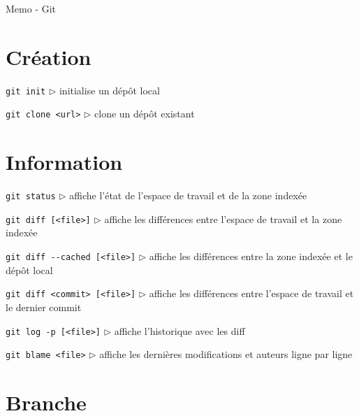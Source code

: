 \documentclass[a4paper,oneside,twocolumn]{article}
\begin{document}
\begin{center}
	\huge Memo - Git
\end{center}


\vspace{-3mm}
\section{Création}
\vspace{-2mm}

\noindent\verb?git init?\linebreak
$\triangleright$ initialise un dépôt local

\noindent\verb?git clone <url>?\linebreak
$\triangleright$ clone un dépôt existant

\vspace{-3mm}
\section{Information}
\vspace{-2mm}

\noindent\verb?git status?\linebreak
$\triangleright$ affiche l'état de l'espace de travail et de la zone indexée

\noindent\verb?git diff [<file>]?\linebreak
$\triangleright$ affiche les différences entre l'espace de travail et la zone indexée

\noindent\verb?git diff --cached [<file>]?\linebreak
$\triangleright$ affiche les différences entre la zone indexée et le dépôt local

\noindent\verb?git diff <commit> [<file>]?\linebreak
$\triangleright$ affiche les différences entre l'espace de travail et le dernier commit

\noindent\verb?git log -p [<file>]?\linebreak
$\triangleright$ affiche l'historique avec les diff

\noindent\verb?git blame <file>?\linebreak
$\triangleright$ affiche les dernières modifications et auteurs ligne par ligne

\vspace{-3mm}
\section{Branche}
\vspace{-2mm}
\end{document}
